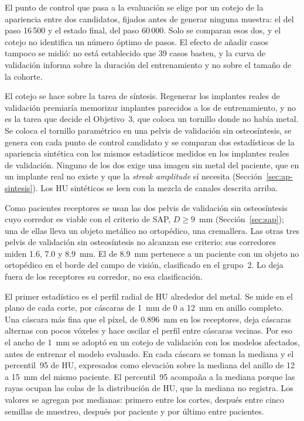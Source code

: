 El punto de control que pasa a la evaluación se elige por un cotejo de la apariencia entre dos candidatos, fijados antes de generar ninguna muestra: el del paso 16\,500 y el estado final, del paso 60\,000. Solo se comparan esos dos, y el cotejo no identifica un número óptimo de pasos. El efecto de añadir casos tampoco se midió: no está establecido que 39 casos basten, y la curva de validación informa sobre la duración del entrenamiento y no sobre el tamaño de la cohorte.

El cotejo se hace sobre la tarea de síntesis. Regenerar los implantes reales de validación premiaría memorizar implantes parecidos a los de entrenamiento, y no es la tarea que decide el Objetivo~3, que coloca un tornillo donde no había metal. Se coloca el tornillo paramétrico en una pelvis de validación sin osteosíntesis, se genera con cada punto de control candidato y se comparan dos estadísticos de la apariencia sintética con los mismos estadísticos medidos en los implantes reales de validación. Ninguno de los dos exige una imagen sin metal del paciente, que en un implante real no existe y que la \emph{streak amplitude} sí necesita (Sección~\ref{sec:ap-sintesis}). Los HU sintéticos se leen con la mezcla de canales descrita arriba.

Como pacientes receptores se usan las dos pelvis de validación sin osteosíntesis cuyo corredor es viable con el criterio de SAP, $D \geq 9$~mm (Sección~\ref{sec:sap}); una de ellas lleva un objeto metálico no ortopédico, una cremallera. Las otras tres pelvis de validación sin osteosíntesis no alcanzan ese criterio: sus corredores miden 1.6, 7.0 y 8.9~mm. El de 8.9~mm pertenece a un paciente con un objeto no ortopédico en el borde del campo de visión, clasificado en el grupo~2. Lo deja fuera de los receptores su corredor, no esa clasificación.

El primer estadístico es el perfil radial de HU alrededor del metal. Se mide en el plano de cada corte, por cáscaras de 1~mm de 0 a 12~mm en anillo completo. Una cáscara más fina que el píxel, de 0.896~mm en los receptores, deja cáscaras alternas con pocos vóxeles y hace oscilar el perfil entre cáscaras vecinas. Por eso el ancho de 1~mm se adoptó en un cotejo de validación con los modelos afectados, antes de entrenar el modelo evaluado. En cada cáscara se toman la mediana y el percentil~95 de HU, expresados como elevación sobre la mediana del anillo de 12 a 15~mm del mismo paciente. El percentil~95 acompaña a la mediana porque las rayas ocupan las colas de la distribución de HU, que la mediana no registra. Los valores se agregan por medianas: primero entre los cortes, después entre cinco semillas de muestreo, después por paciente y por último entre pacientes.

